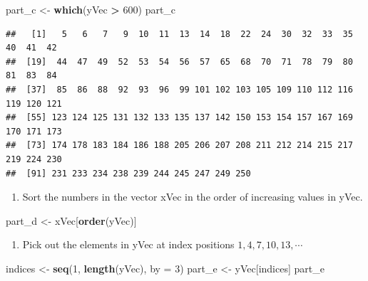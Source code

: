 \documentclass[
]{article}
\newenvironment{Shaded}{\begin{snugshade}}{\end{snugshade}}
\newcommand{\AttributeTok}[1]{\textcolor[rgb]{0.13,0.29,0.53}{#1}}
\newcommand{\DecValTok}[1]{\textcolor[rgb]{0.00,0.00,0.81}{#1}}
\newcommand{\FunctionTok}[1]{\textcolor[rgb]{0.13,0.29,0.53}{\textbf{#1}}}
\newcommand{\NormalTok}[1]{#1}
\newcommand{\OtherTok}[1]{\textcolor[rgb]{0.56,0.35,0.01}{#1}}
\newcommand{\SpecialCharTok}[1]{\textcolor[rgb]{0.81,0.36,0.00}{\textbf{#1}}}
\providecommand{\tightlist}{%
  \setlength{\itemsep}{0pt}\setlength{\parskip}{0pt}}
\begin{document}
\begin{Shaded}
\begin{Highlighting}[]
\NormalTok{part\_c }\OtherTok{\textless{}{-}} \FunctionTok{which}\NormalTok{(yVec }\SpecialCharTok{\textgreater{}} \DecValTok{600}\NormalTok{)}
\NormalTok{part\_c}
\end{Highlighting}
\end{Shaded}

\begin{verbatim}
##   [1]   5   6   7   9  10  11  13  14  18  22  24  30  32  33  35  40  41  42
##  [19]  44  47  49  52  53  54  56  57  65  68  70  71  78  79  80  81  83  84
##  [37]  85  86  88  92  93  96  99 101 102 103 105 109 110 112 116 119 120 121
##  [55] 123 124 125 131 132 133 135 137 142 150 153 154 157 167 169 170 171 173
##  [73] 174 178 183 184 186 188 205 206 207 208 211 212 214 215 217 219 224 230
##  [91] 231 233 234 238 239 244 245 247 249 250
\end{verbatim}

\begin{enumerate}
\def\labelenumi{(\alph{enumi})}
\setcounter{enumi}{3}
\tightlist
\item
  Sort the numbers in the vector xVec in the order of increasing values
  in yVec.
\end{enumerate}

\begin{Shaded}
\begin{Highlighting}[]
\NormalTok{part\_d }\OtherTok{\textless{}{-}}\NormalTok{ xVec[}\FunctionTok{order}\NormalTok{(yVec)]}
\end{Highlighting}
\end{Shaded}

\begin{enumerate}
\def\labelenumi{(\alph{enumi})}
\setcounter{enumi}{4}
\tightlist
\item
  Pick out the elements in yVec at index positions
  \(1, 4, 7, 10, 13, \cdots\)
\end{enumerate}

\begin{Shaded}
\begin{Highlighting}[]
\NormalTok{indices }\OtherTok{\textless{}{-}} \FunctionTok{seq}\NormalTok{(}\DecValTok{1}\NormalTok{, }\FunctionTok{length}\NormalTok{(yVec), }\AttributeTok{by =} \DecValTok{3}\NormalTok{)}
\NormalTok{part\_e }\OtherTok{\textless{}{-}}\NormalTok{ yVec[indices]}
\NormalTok{part\_e}
\end{Highlighting}
\end{Shaded}
\end{document}
